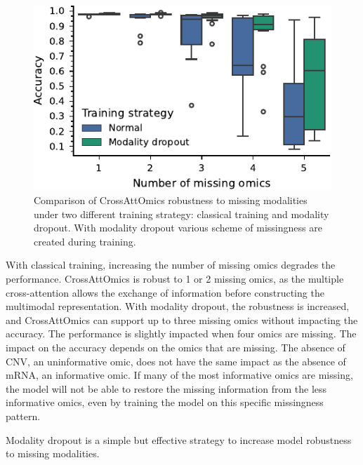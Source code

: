 \documentclass[../main.tex]{subfiles}
\begin{document}
     \begin{figure}[htbp]
         \centering
         \includegraphics{robustness_missing_modalities_dropout.pdf}
         \caption{Comparison of CrossAttOmics robustness to missing modalities under two different training strategy: classical training and modality dropout. With modality dropout various scheme of missingness are created during training.}
         \label{fig:modality_dropout}
     \end{figure}

     With classical training, increasing the number of missing omics degrades the performance.
     CrossAttOmics is robust to 1 or 2 missing omics, as the multiple cross-attention allows the exchange of information before constructing the multimodal representation.
     With modality dropout, the robustness is increased, and CrossAttOmics can support up to three missing omics without impacting the accuracy.
     The performance is slightly impacted when four omics are missing.
     The impact on the accuracy depends on the omics that are missing.
     The absence of CNV, an uninformative omic, does not have the same impact as the absence of mRNA, an informative omic.
     If many of the most informative omics are missing, the model will not be able to restore the missing information from the less informative omics, even by training the model on this specific missingness pattern.

     Modality dropout is a simple but effective strategy to increase model robustness to missing modalities.
\end{document}
